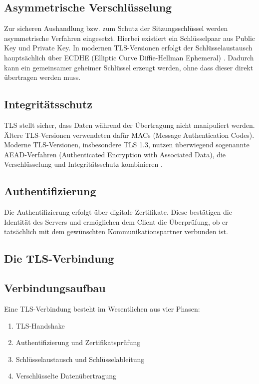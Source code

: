 \subsection*{Asymmetrische Verschlüsselung}
Zur sicheren Aushandlung bzw. zum Schutz der Sitzungsschlüssel werden asymmetrische Verfahren eingesetzt. Hierbei existiert ein Schlüsselpaar aus Public Key und Private Key.
In modernen TLS-Versionen erfolgt der Schlüsselaustausch hauptsächlich über ECDHE (Elliptic Curve Diffie-Hellman Ephemeral) \cite{rfc8446}. Dadurch kann ein gemeinsamer geheimer Schlüssel erzeugt werden, ohne dass dieser direkt übertragen werden muss.

\subsection*{Integritätsschutz}
TLS stellt sicher, dass Daten während der Übertragung nicht manipuliert werden. Ältere TLS-Versionen verwendeten dafür MACs (Message Authentication Codes). Moderne TLS-Versionen, insbesondere TLS 1.3, nutzen überwiegend sogenannte AEAD-Verfahren (Authenticated Encryption with Associated Data), die Verschlüsselung und Integritätsschutz kombinieren \cite{rfc8446}.

\subsection*{Authentifizierung}
Die Authentifizierung erfolgt über digitale Zertifikate. Diese bestätigen die Identität des Servers und ermöglichen dem Client die Überprüfung, ob er tatsächlich mit dem gewünschten Kommunikationspartner verbunden ist.


\subsection{Die TLS-Verbindung}
\subsection*{Verbindungsaufbau}
Eine TLS-Verbindung besteht im Wesentlichen aus vier Phasen:
\begin{enumerate}
  \item TLS-Handshake
  \item Authentifizierung und Zertifikatsprüfung
  \item Schlüsselaustausch und Schlüsselableitung
  \item Verschlüsselte Datenübertragung
\end{enumerate}

